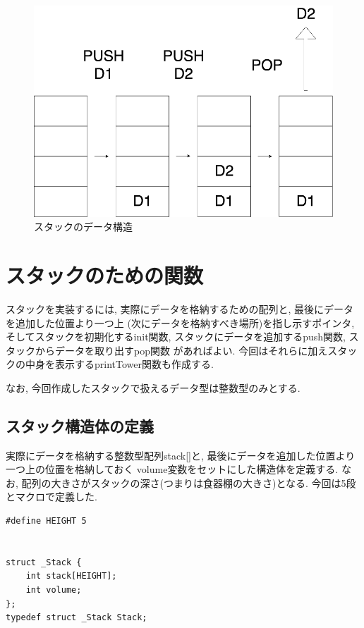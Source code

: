 \documentclass[a4j]{jsarticle}
\begin{document}
    \begin{figure}[H]
        \centering
        \includegraphics[scale=0.3]{stack.png}
        \caption{スタックのデータ構造}
        \label{stack}
    \end{figure}
\section{スタックのための関数}
    スタックを実装するには, 実際にデータを格納するための配列と, 最後にデータを追加した位置より一つ上
    (次にデータを格納すべき場所)を指し示すポインタ, 
    そしてスタックを初期化するinit関数, スタックにデータを追加するpush関数, スタックからデータを取り出すpop関数
    があればよい. 今回はそれらに加えスタックの中身を表示するprintTower関数も作成する. 

    なお, 今回作成したスタックで扱えるデータ型は整数型のみとする. 

    \subsection{スタック構造体の定義}
    実際にデータを格納する整数型配列stack[]と, 最後にデータを追加した位置より一つ上の位置を格納しておく
    volume変数をセットにした構造体を定義する. 
    なお, 配列の大きさがスタックの深さ(つまりは食器棚の大きさ)となる. 今回は5段とマクロで定義した. 
    \begin{lstlisting}[label = s-1, caption = スタック構造体の定義]
#define HEIGHT 5


struct _Stack {
	int stack[HEIGHT];
	int volume;
};
typedef struct _Stack Stack;
    \end{lstlisting}
\end{document}

